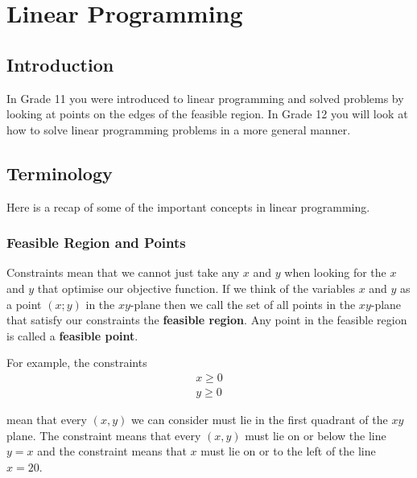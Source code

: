 \chapter{Linear Programming}
\label{m:lp12}



\section{Introduction}
In Grade 11 you were introduced to linear programming and solved problems by looking at points on the edges of the feasible region. In Grade 12 you will look at how to solve linear programming problems in a more general manner.

\section{Terminology}
Here is a recap of some of the important concepts in linear programming.

\subsection{Feasible Region and Points}
Constraints mean that we cannot just take any $x$ and $y$ when looking for the $x$ and $y$ that optimise our objective function. If we think of the variables $x$ and $y$ as a point $(x;y)$ in the $xy$-plane then we call the set of all points in the $xy$-plane that satisfy 
our constraints the \textbf{feasible region}. Any point in the feasible region is called a \textbf{feasible point}.

For example, the constraints
\begin{eqnarray*}
x\geq 0\\
y\geq 0
\end{eqnarray*}

mean that every $(x,y)$ we can consider must lie in the first quadrant of the $xy$ plane. The constraint
means that every $(x,y)$ must lie on or below the line $y=x$ and the constraint
means that $x$ must lie on or to the left of the line $x=20$. 


